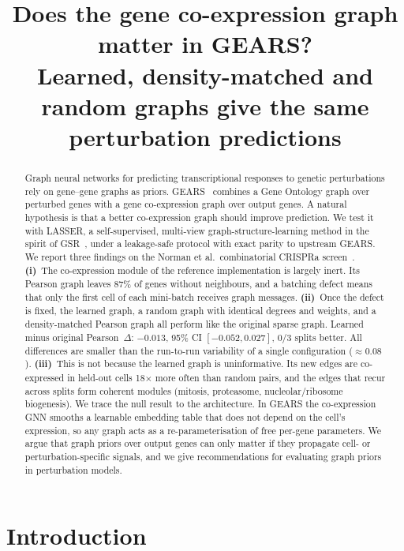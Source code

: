 \documentclass[11pt]{article}
\title{Does the gene co-expression graph matter in GEARS?\\
\large Learned, density-matched and random graphs give the same perturbation predictions}
\author{\todo{author names and affiliations}}
\date{}
\newcommand{\GEARS}{\textsc{GEARS}}
\newcommand{\LASSER}{\textsc{LASSER}}
\begin{document}
\maketitle

\begin{abstract}
Graph neural networks for predicting transcriptional responses to genetic perturbations rely on gene--gene graphs as
priors. \GEARS{}~\cite{roohani2024gears} combines a Gene Ontology graph over perturbed genes with a gene
co-expression graph over output genes. A natural hypothesis is that a better co-expression graph should improve
prediction. We test it with \LASSER{}, a self-supervised, multi-view graph-structure-learning method in the spirit
of GSR~\cite{zhao2023gsr}, under a leakage-safe protocol with exact parity to upstream \GEARS{}.
We report three findings on the Norman et al.\ combinatorial CRISPRa screen~\cite{norman2019}.
\textbf{(i)}~The co-expression module of the reference implementation is largely inert. Its Pearson graph leaves
87\% of genes without neighbours, and a batching defect means that only the first cell of each mini-batch receives
graph messages.
\textbf{(ii)}~Once the defect is fixed, the learned graph, a random graph with identical degrees and weights, and a
density-matched Pearson graph all perform like the original sparse graph. Learned minus original Pearson~$\Delta$:
$-0.013$, 95\% CI $[-0.052, 0.027]$, 0/3 splits better. All differences are smaller than the run-to-run
variability of a single configuration ($\approx 0.08$).
\textbf{(iii)}~This is not because the learned graph is uninformative. Its new edges are co-expressed in held-out
cells 18$\times$ more often than random pairs, and the edges that recur across splits form coherent modules
(mitosis, proteasome, nucleolar/ribosome biogenesis).
We trace the null result to the architecture. In \GEARS{} the co-expression GNN smooths a learnable embedding table
that does not depend on the cell's expression, so any graph acts as a re-parameterisation of free per-gene
parameters. We argue that graph priors over output genes can only matter if they propagate cell- or
perturbation-specific signals, and we give recommendations for evaluating graph priors in perturbation models.
\end{abstract}

\section{Introduction}
\end{document}
